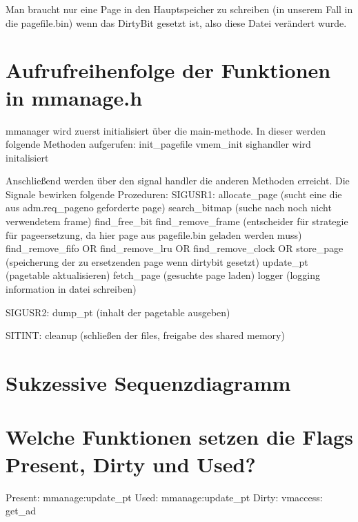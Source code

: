 \documentclass[pdftex,10pt,a4paper]{article}
\begin{document}
Man braucht nur eine Page in den Hauptspeicher zu schreiben (in unserem Fall in die pagefile.bin) wenn das DirtyBit gesetzt ist, also diese Datei verändert wurde.

\section{Aufrufreihenfolge der Funktionen in mmanage.h}
mmanager wird zuerst initialisiert über die main-methode. In dieser werden folgende Methoden aufgerufen:
init_pagefile
vmem_init
sighandler wird initalisiert

Anschließend werden über den signal handler die anderen Methoden erreicht. Die Signale bewirken folgende Prozeduren:
SIGUSR1:
allocate_page (sucht eine die aus adm.req_pageno geforderte page)
	search_bitmap  (suche nach noch nicht verwendetem frame)
		find_free_bit
	find_remove_frame (entscheider für strategie für pageersetzung, da hier page aus pagefile.bin geladen werden muss)
		find_remove_fifo OR
		find_remove_lru OR
		find_remove_clock OR
	store_page (speicherung der zu ersetzenden page wenn dirtybit gesetzt)
	update_pt (pagetable aktualisieren)
	fetch_page (gesuchte page laden)
	logger	(logging information in datei schreiben)
	
SIGUSR2:
dump_pt (inhalt der pagetable ausgeben)

SITINT:
cleanup (schließen der files, freigabe des shared memory)

\section{Sukzessive Sequenzdiagramm}


\section{Welche Funktionen setzen die Flags Present, Dirty und Used?}
Present: mmanage:update_pt
Used: mmanage:update_pt
Dirty: vmaccess: get_ad



\end{document}
